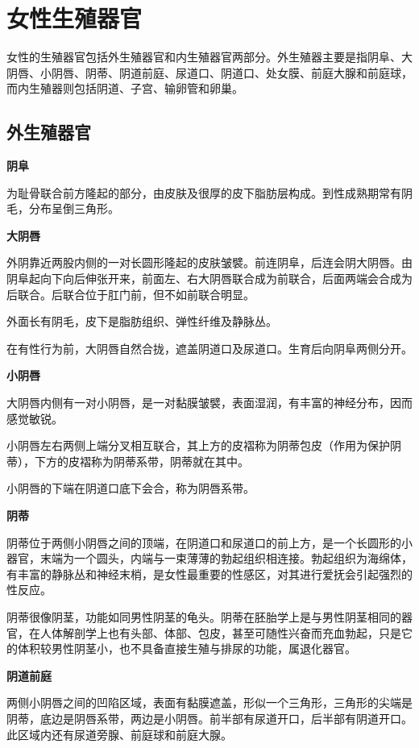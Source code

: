 \documentclass[12pt,UTF8]{ctexbook}
\begin{document}
\chapter{女性生殖器官}

女性的生殖器官包括外生殖器官和内生殖器官两部分。外生殖器主要是指阴阜、大阴唇、小阴唇、阴蒂、阴道前庭、尿道口、阴道口、处女膜、前庭大腺和前庭球，而内生殖器则包括阴道、子宫、输卵管和卵巢。

\section{外生殖器官}

\textbf{阴阜}

为耻骨联合前方隆起的部分，由皮肤及很厚的皮下脂肪层构成。到性成熟期常有阴毛，分布呈倒三角形。

\textbf{大阴唇}

外阴靠近两股内侧的一对长圆形隆起的皮肤皱襞。前连阴阜，后连会阴大阴唇。由阴阜起向下向后伸张开来，前面左、右大阴唇联合成为前联合，后面两端会合成为后联合。后联合位于肛门前，但不如前联合明显。

外面长有阴毛，皮下是脂肪组织、弹性纤维及静脉丛。

在有性行为前，大阴唇自然合拢，遮盖阴道口及尿道口。生育后向阴阜两侧分开。

\textbf{小阴唇}

大阴唇内侧有一对小阴唇，是一对黏膜皱襞，表面湿润，有丰富的神经分布，因而感觉敏锐。

小阴唇左右两侧上端分叉相互联合，其上方的皮褶称为阴蒂包皮（作用为保护阴蒂），下方的皮褶称为阴蒂系带，阴蒂就在其中。

小阴唇的下端在阴道口底下会合，称为阴唇系带。

\textbf{阴蒂}

阴蒂位于两侧小阴唇之间的顶端，在阴道口和尿道口的前上方，是一个长圆形的小器官，末端为一个圆头，内端与一束薄薄的勃起组织相连接。勃起组织为海绵体，有丰富的静脉丛和神经末梢，是女性最重要的性感区，对其进行爱抚会引起强烈的性反应。

阴蒂很像阴茎，功能如同男性阴茎的龟头。阴蒂在胚胎学上是与男性阴茎相同的器官，在人体解剖学上也有头部、体部、包皮，甚至可随性兴奋而充血勃起，只是它的体积较男性阴茎小，也不具备直接生殖与排尿的功能，属退化器官。

\textbf{阴道前庭}

两侧小阴唇之间的凹陷区域，表面有黏膜遮盖，形似一个三角形，三角形的尖端是阴蒂，底边是阴唇系带，两边是小阴唇。前半部有尿道开口，后半部有阴道开口。此区域内还有尿道旁腺、前庭球和前庭大腺。
\end{document}
